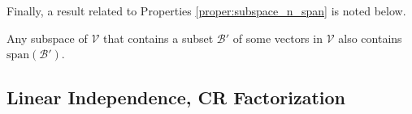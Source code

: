 Finally, a result related to Properties \ref{proper:subspace_n_span} is noted below.
\begin{proper}
\label{proper:WcontainsspanS}
Any subspace of $\mathcal{V}$ that contains a subset $\mathcal{B}'$ of some vectors in $\mathcal{V}$ also contains $\text{span}(\mathcal{B}')$.
\end{proper}

%

\subsection{Linear Independence, CR Factorization}
\label{section:linearind}

